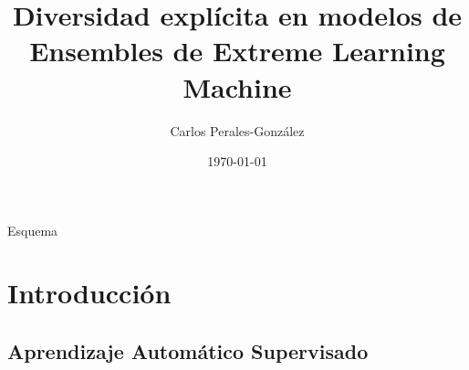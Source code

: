 \documentclass{beamer}
\title[Diversidad en ensembles de ELM]{Diversidad explícita en modelos de Ensembles de Extreme Learning Machine}
\author[C. Perales-González]
{   %
    Carlos Perales-Gonz\'alez\inst{1}
}
\institute[ULOYOLA]
{   %
    \begin{tabular}{c}
    \inst{1}Universidad Loyola Andaluc\'ia
    \end{tabular}
}
\date
{   %
	\today
}
\begin{document}
\frame{\titlepage}

\begin{frame}{Esquema}
\tableofcontents
\end{frame}


\section{Introducción} %

%	
%	
%	
%

\subsection{Aprendizaje Automático Supervisado}

%
%	
\end{document}
